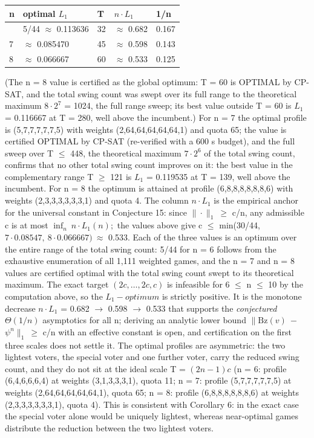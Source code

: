 \documentclass[
]{article}
\newcounter{none} %
\begin{document}
{\def\LTcaptype{none} %
\begin{longtable}[]{@{}lllll@{}}
\toprule\noalign{}
n & optimal \(L_1\) & T & \(n\cdot L_1\) & 1/n \\
\midrule\noalign{}
\endhead
\bottomrule\noalign{}
\endlastfoot
6 & 5/44 \(\approx\) 0.113636 & 32 & \(\approx\) 0.682 & 0.167 \\
7 & \(\approx\) 0.085470 & 45 & \(\approx\) 0.598 & 0.143 \\
8 & \(\approx\) 0.066667 & 60 & \(\approx\) 0.533 & 0.125 \\
\end{longtable}
}

(The n = 8 value is certified as the global optimum: T = 60 is OPTIMAL
by CP-SAT, and the total swing count was swept over its full range to
the theoretical maximum \(8\cdot2^7\) = 1024, the full range sweep; its
best value outside T = 60 is \(L_1\) = 0.116667 at T = 280, well above
the incumbent.) For n = 7 the optimal profile is (5,7,7,7,7,7,5) with
weights (2,64,64,64,64,64,1) and quota 65; the value is certified
OPTIMAL by CP-SAT (re-verified with a 600 s budget), and the full sweep
over T \(\le\) 448, the theoretical maximum \(7\cdot2^6\) of the total
swing count, confirms that no other total swing count improves on it:
the best value in the complementary range T \(\ge\) 121 is \(L_1\) =
0.119535 at T = 139, well above the incumbent. For n = 8 the optimum is
attained at profile (6,8,8,8,8,8,8,6) with weights (2,3,3,3,3,3,3,1) and
quota 4. The column \(n\cdot L_1\) is the empirical anchor for the
universal constant in Conjecture 15: since \(\|\cdot\|_1\ \ge\) c/n, any
admissible c is at most \(\inf_n\ n\cdot L_1(n);\) the values above give
c \(\le\) min(30/44, \(7\cdot0.08547,\ 8\cdot0.066667)\ \approx\) 0.533.
Each of the three values is an optimum over the entire range of the
total swing count: 5/44 for n = 6 follows from the exhaustive
enumeration of all 1,111 weighted games, and the n = 7 and n = 8 values
are certified optimal with the total swing count swept to its
theoretical maximum. The exact target \((2c,\dots,2c,c)\) is infeasible
for 6 \(\le\) n \(\le\) 10 by the computation above, so the
\(L_1-optimum\) is strictly positive. It is the monotone decrease
\(n\cdot L_1\) = 0.682 \(\to\) 0.598 \(\to\) 0.533 that supports the
\emph{conjectured} \(\Theta(1/n)\) asymptotics for all n; deriving an
analytic lower bound \(\|\mathrm{Bz}(v)\ -\) \(\psi^n\|_1\ \ge\) c/n
with an effective constant is open, and certification on the first three
scales does not settle it. The optimal profiles are asymmetric: the two
lightest voters, the special voter and one further voter, carry the
reduced swing count, and they do not sit at the ideal scale T =
\((2n-1)c\) (n = 6: profile (6,4,6,6,6,4) at weights (3,1,3,3,3,1),
quota 11; n = 7: profile (5,7,7,7,7,7,5) at weights
(2,64,64,64,64,64,1), quota 65; n = 8: profile (6,8,8,8,8,8,8,6) at
weights (2,3,3,3,3,3,3,1), quota 4). This is consistent with Corollary
6: in the exact case the special voter alone would be uniquely lightest,
whereas near-optimal games distribute the reduction between the two
lightest voters.
\end{document}
